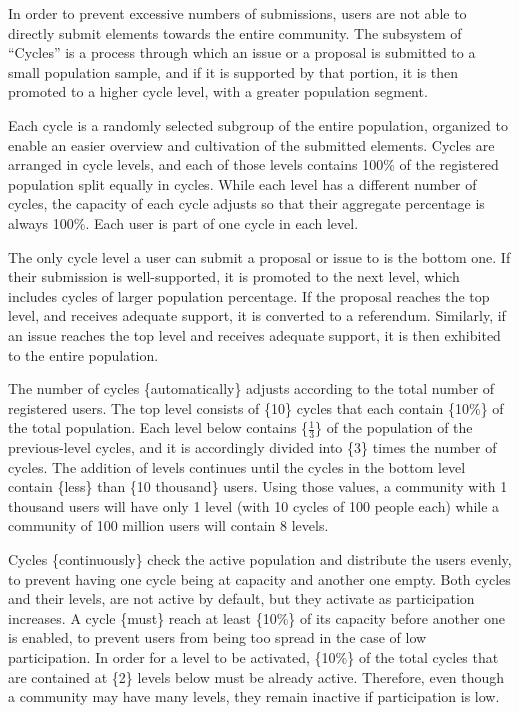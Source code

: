 \documentclass[a4paper,11pt]{article}
\begin{document}
\begin{multicols}{2}
In order to prevent excessive numbers of submissions, users are not able to directly submit elements towards the entire community. The subsystem of “Cycles” is a process through which an issue or a proposal is submitted to a small population sample, and if it is supported by that portion, it is then promoted to a higher cycle level, with a greater population segment.

Each cycle is a randomly selected subgroup of the entire population, organized to enable an easier overview and cultivation of the submitted elements. Cycles are arranged in cycle levels, and each of those levels contains 100\% of the registered population split equally in cycles. While each level has a different number of cycles, the capacity of each cycle adjusts so that their aggregate percentage is always 100\%. Each user is part of one cycle in each level.

The only cycle level a user can submit a proposal or issue to is the bottom one. If their submission is well-supported, it is promoted to the next level, which includes cycles of larger population percentage. If the proposal reaches the top level, and receives adequate support, it is converted to a referendum. Similarly, if an issue reaches the top level and receives adequate support, it is then exhibited to the entire population.

The number of cycles \{automatically\} adjusts according to the total number of registered users. The top level consists of \{10\} cycles that each contain \{10\%\} of the total population. Each level below contains \{$\frac{1}{3}$\} of the population of the previous-level cycles, and it is accordingly divided into \{3\} times the number of cycles. The addition of levels continues until the cycles in the bottom level contain \{less\} than \{10 thousand\} users. Using those values, a community with 1 thousand users will have only 1 level (with 10 cycles of 100 people each) while a community of 100 million users will contain 8 levels.

Cycles \{continuously\} check the active population and distribute the users evenly, to prevent having one cycle being at capacity and another one empty. Both cycles and their levels, are not active by default, but they activate as participation increases. A cycle \{must\} reach at least \{10\%\} of its capacity before another one is enabled, to prevent users from being too spread in the case of low participation. In order for a level to be activated, \{10\%\} of the total cycles that are contained at \{2\} levels below must be already active. Therefore, even though a community may have many levels, they remain inactive if participation is low.


\end{multicols}
\end{document}
